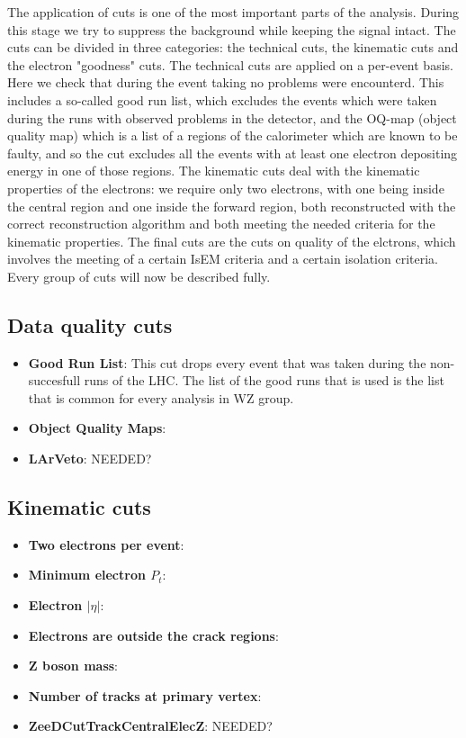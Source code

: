 The application of cuts is one of the most important parts of the analysis. During this stage we try to suppress the background while keeping the signal intact. The cuts can be divided in three categories: the technical cuts, the kinematic cuts and the electron "goodness" cuts. The technical cuts are applied on a per-event basis. Here we check that during the event taking no problems were encounterd. This includes a so-called good run list, which excludes the events which were taken during the runs with observed problems in the detector, and the OQ-map (object quality map) which is a list of a regions of the calorimeter which are known to be faulty, and so the cut excludes all the events with at least one electron depositing energy in one of those regions. The kinematic cuts deal with the kinematic properties of the electrons: we require only two electrons, with one being inside the central region and one inside the forward region, both reconstructed with the correct reconstruction algorithm and both meeting the needed criteria for the kinematic properties. The final cuts are the cuts on quality of the elctrons, which involves the meeting of a certain IsEM criteria and a certain isolation criteria. Every group of cuts will now be described fully.

\subsection{Data quality cuts}
\label{sec:Sel_GRL_OQ}

\begin{itemize}
\item {\bfseries Good Run List}: This cut drops every event that was taken during the non-succesfull runs of the LHC. The list of the good runs that is used is the list that is common for every analysis in WZ group.
\item {\bfseries Object Quality Maps}:
\item {\bfseries LArVeto}: \tbu NEEDED?
\end{itemize}

\subsection{Kinematic cuts}
\label{sec:Sel_kinematic}

\begin{itemize}
\item {\bfseries Two electrons per event}:
\item {\bfseries Minimum electron $P_{t}$}:
\item {\bfseries Electron $|\eta|$}:
\item {\bfseries Electrons are outside the crack regions}:
\item {\bfseries Z boson mass}:
\item {\bfseries Number of tracks at primary vertex}:
\item {\bfseries ZeeDCutTrackCentralElecZ}: \tbu NEEDED?
\end{itemize}


